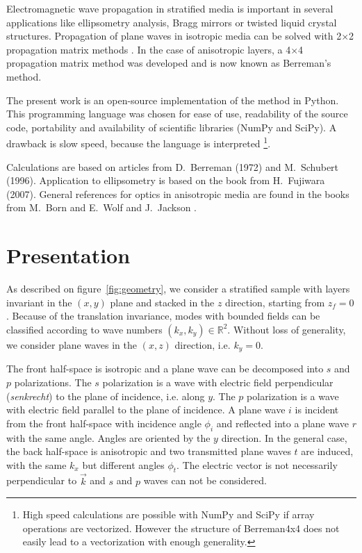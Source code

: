 

Electromagnetic wave propagation in stratified media is important in several applications like ellipsometry analysis, Bragg mirrors or twisted liquid crystal structures.
Propagation of plane waves in isotropic media can be solved with 2$\times$2 propagation matrix methods \cite{BornWolf}.
In the case of anisotropic layers, a 4$\times$4 propagation matrix method was developed \cite{1970_TeilerHenvis, Berreman} and is now known as Berreman's method. 

The present work is an open-source implementation of the method in Python.
This programming language was chosen for ease of use, readability of the source code, portability and availability of scientific libraries (NumPy and SciPy).
A drawback is slow speed, because the language is interpreted%
\footnote{%
High speed calculations are possible with NumPy and SciPy if array operations are vectorized.
However the structure of Berreman4x4 does not easily lead to a vectorization with enough generality.}.

Calculations are based on articles from D.~Berreman \cite{Berreman} (1972) and M.~Schubert \cite{Schubert} (1996).
Application to ellipsometry is based on the book from H.~Fujiwara \cite{Fujiwara} (2007).
General references for optics in anisotropic media are found in the books from M.~Born and E.~Wolf \cite{BornWolf} and J.~Jackson \cite{Jackson}.

\section{Presentation}

As described on figure~\ref{fig:geometry}, we consider a stratified sample with layers invariant in the $(x,y)$ plane and stacked in the $z$ direction, starting from $z_f=0$.
Because of the translation invariance, modes with bounded fields can be classified according to wave numbers $(k_x,k_y)\in\mathbb{R}^2$.
Without loss of generality, we consider plane waves in the $(x,z)$ direction, i.e. $k_y=0$.

The front half-space is isotropic and a plane wave can be decomposed into $s$ and $p$ polarizations.
The $s$ polarization is a wave with electric field perpendicular (\emph{senkrecht}) to the plane of incidence, i.e. along $y$.
The $p$ polarization is a wave with electric field parallel to the plane of incidence.
A plane wave $i$ is incident from the front half-space with incidence angle $\phi_i$ and reflected into a plane wave $r$ with the same angle.
Angles are oriented by the $y$ direction.
In the general case, the back half-space is anisotropic and two transmitted plane waves $t$ are induced, with the same $k_x$ but different angles $\phi_t$.
The electric vector is not necessarily perpendicular to $\vec k$ and $s$ and $p$ waves can not be considered.

